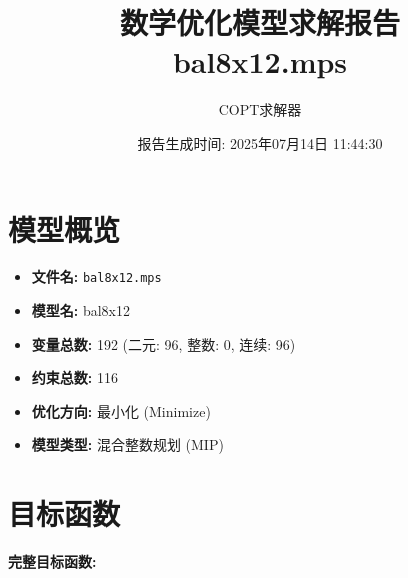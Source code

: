\documentclass[a4paper,10pt]{article}
\title{数学优化模型求解报告\\{\large bal8x12.mps}}
\author{COPT求解器}
\date{报告生成时间: 2025年07月14日 11:44:30}
\begin{document}
\maketitle
\tableofcontents
\newpage

\section{模型概览}
\begin{itemize}
    \item \textbf{文件名:} \texttt{bal8x12.mps}
    \item \textbf{模型名:} bal8x12
    \item \textbf{变量总数:} 192 (二元: 96, 整数: 0, 连续: 96)
    \item \textbf{约束总数:} 116
    \item \textbf{优化方向:} 最小化 (Minimize)
    \item \textbf{模型类型:} 混合整数规划 (MIP)
\end{itemize}
\section{目标函数}

\textbf{完整目标函数:}
\end{document}
